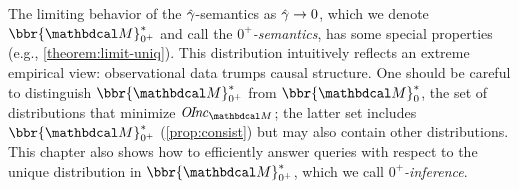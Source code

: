 The limiting behavior of the $\zogamma$-semantics as $\zogamma \to 0$,
which we denote $\bbr{\dg M}^*_{0^+}$ and call the \emph{$0^+$\!-semantics},
has some special properties (e.g., \cref{theorem:limit-uniq}).
This distribution intuitively
reflects an extreme empirical
view: observational data trumps causal structure.
One should be careful to distinguish 
$\bbr{\dg M}^*_{0^+}$
from $\bbr{\dg M}^*_0$,
the set of distributions that minimize
$\OInc_{\dg M}$; the latter  set
includes
 $\bbr{\dg M}^*_{0^+}$
(\cref{prop:consist})
but may also contain other distributions.
This chapter also shows how to efficiently answer queries with respect 
to the unique distribution in $\bbr{\dg M}^*_{0^+}$, which we call
\emph{$0^+$\!-inference}.




